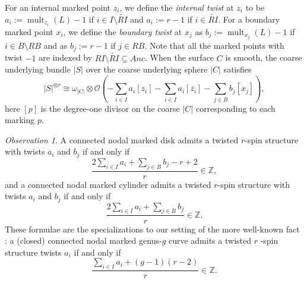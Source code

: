 \documentclass[11pt]{amsart}
\theoremstyle{definition}
\theoremstyle{remark}
\newtheorem{obs}[dummy]{Observation}
\newcommand{\<}{\left<}
\renewcommand{\>}{\right>}
\numberwithin{equation}{section}
\begin{document}
For an internal marked point $z_i$, we define the  \textit{internal twist} at $z_i$ to be $a_i:=\operatorname{mult}_{z_i}(L)-1$ if $i\in I\setminus \widetilde{RI}$
and $a_i:=r-1$ if $i\in \widetilde{RI}$. For a boundary marked point $x_i$, we define the  \textit{boundary twist} at $x_j$ as $b_j:=\operatorname{mult}_{x_j}(L)-1$ if $i\in B\setminus {RB}$ and as $b_j:=r-1$ if $j\in {RB}$. Note that all the marked points with twist $-1$ are indexed by $RI\setminus \widetilde{RI}\subseteq Anc$. When the surface $C$ is smooth, the coarse underlying bundle $|S|$ over the coarse underlying sphere $|C|$ %
satisfies
$$|S|^{\otimes r} \cong \omega_{|C|} \otimes {\mathcal{O}}\left(-\sum_{i \in I} a_i [z_i] - \sum_{i \in I} a_i [\overline{z_i}] - \sum_{j \in B} b_j[x_j]\right),$$
here $[p]$ %
is the degree-one divisor on the coarse $|C|$ corresponding to each marking $p$.


\begin{obs}
\label{obs rank open}
A connected nodal marked disk admits a twisted $r$-spin structure with twists $a_i$ and $b_j$ if and only if
\begin{equation}\label{eq mod r condition g=0}
\frac{2\sum_{i \in I} a_i + \sum_{j\in B} b_j -r+2}{r}\in \mathbb Z,
\end{equation}
and a connected nodal marked cylinder admits a twisted $r$-spin structure with twists $a_i$ and $b_j$ if and only if
\begin{equation}\label{eq mod r condition rk g=1}
\frac{2\sum_{i \in I} a_i + \sum_{j\in B} b_j}{r}\in \mathbb Z.
\end{equation}
These formulae are the specializations to our setting of the more %
well-known fact \cite{Witten93}: a %
(closed) connected nodal marked genus-$g$ curve admits a twisted $r$%
-spin structure twists $a_i$ %
if and only if 
\begin{equation}\label{eq rank close}
\frac{\sum_{i\in I} a_i +(g-1)(r-2)}{r}\in {\mathbb{Z}}.
\end{equation}
\end{obs}
\end{document}
